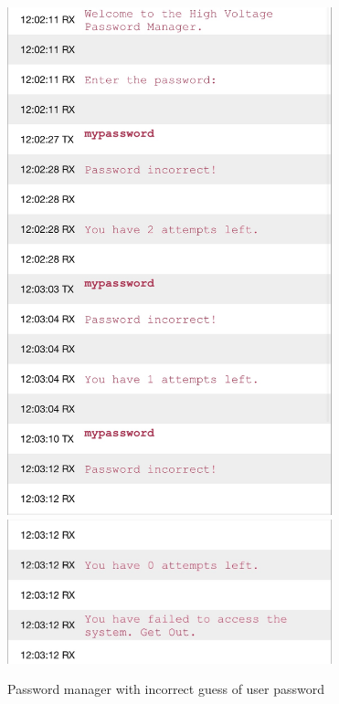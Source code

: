 \documentclass[12pt]{article}
\begin{document}
\begin{figure}[H]
\centering
\includegraphics[width=3.7in]{IMG_2450.jpg}
\includegraphics[width=3.7in]{IMG_2451.jpg}
\caption{Password manager with incorrect guess of user password}
\label{fig:fail}
\end{figure}
\end{document}
